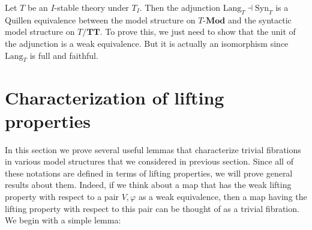 \documentclass[reqno]{amsart}
\theoremstyle{definition}
\theoremstyle{remark}
\newcommand{\cat}[1]{\mathbf{#1}}
\newcommand{\Mod}[1]{#1\text{-}\cat{Mod}}
\newcommand{\algtt}{\cat{TT}}
\newcommand{\Syn}{\mathrm{Syn}}
\newcommand{\Lang}{\mathrm{Lang}}
\numberwithin{figure}{section}
\begin{document}
Let $T$ be an $I$-stable theory under $T_I$.
Then the adjunction $\Lang_T \dashv \Syn_T$ is a Quillen equivalence between the model structure on $\Mod{T}$ and the syntactic model structure on $T/\algtt$.
To prove this, we just need to show that the unit of the adjunction is a weak equivalence.
But it is actually an isomorphism since $\Lang_T$ is full and faithful.

\section{Characterization of lifting properties}
\label{sec:char-lift-prop}

In this section we prove several useful lemmas that characterize trivial fibrations in various model structures that we considered in previous section.
Since all of these notations are defined in terms of lifting properties, we will prove general results about them.
Indeed, if we think about a map that has the weak lifting property with respect to a pair $V,\varphi$ as a weak equivalence,
then a map having the lifting property with respect to this pair can be thought of as a trivial fibration.
We begin with a simple lemma:
\end{document}
